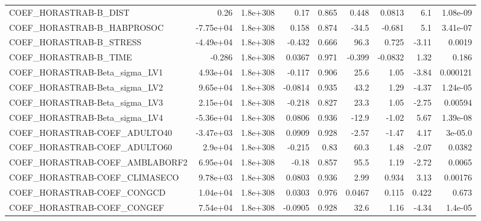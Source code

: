 \begin{tabular}{lrrrrrrrr}
COEF\_HORASTRAB-B\_DIST             &        0.26 &     1.8e+308 &    0.17 &    0.865 &      0.448 &      0.0813 &          6.1 &      1.08e-09 \\
COEF\_HORASTRAB-B\_HABPROSOC        &   -7.75e+04 &     1.8e+308 &   0.158 &    0.874 &      -34.5 &      -0.681 &          5.1 &      3.41e-07 \\
COEF\_HORASTRAB-B\_STRESS           &   -4.49e+04 &     1.8e+308 &  -0.432 &    0.666 &       96.3 &       0.725 &        -3.11 &        0.0019 \\
COEF\_HORASTRAB-B\_TIME             &      -0.286 &     1.8e+308 &  0.0367 &    0.971 &     -0.399 &     -0.0832 &         1.32 &         0.186 \\
COEF\_HORASTRAB-Beta\_sigma\_LV1     &    4.93e+04 &     1.8e+308 &  -0.117 &    0.906 &       25.6 &        1.05 &        -3.84 &      0.000121 \\
COEF\_HORASTRAB-Beta\_sigma\_LV2     &    9.65e+04 &     1.8e+308 & -0.0814 &    0.935 &       43.2 &        1.29 &        -4.37 &      1.24e-05 \\
COEF\_HORASTRAB-Beta\_sigma\_LV3     &    2.15e+04 &     1.8e+308 &  -0.218 &    0.827 &       23.3 &        1.05 &        -2.75 &       0.00594 \\
COEF\_HORASTRAB-Beta\_sigma\_LV4     &   -5.36e+04 &     1.8e+308 &  0.0806 &    0.936 &      -12.9 &       -1.02 &         5.67 &      1.39e-08 \\
COEF\_HORASTRAB-COEF\_ADULTO40      &   -3.47e+03 &     1.8e+308 &  0.0909 &    0.928 &      -2.57 &       -1.47 &         4.17 &       3e-05.0 \\
COEF\_HORASTRAB-COEF\_ADULTO60      &     2.9e+04 &     1.8e+308 &  -0.215 &     0.83 &       60.3 &        1.48 &        -2.07 &        0.0382 \\
COEF\_HORASTRAB-COEF\_AMBLABORF2    &    6.95e+04 &     1.8e+308 &   -0.18 &    0.857 &       95.5 &        1.19 &        -2.72 &        0.0065 \\
COEF\_HORASTRAB-COEF\_CLIMASECO     &    9.78e+03 &     1.8e+308 &  0.0803 &    0.936 &       2.99 &       0.934 &         3.13 &       0.00176 \\
COEF\_HORASTRAB-COEF\_CONGCD        &    1.04e+04 &     1.8e+308 &  0.0303 &    0.976 &     0.0467 &       0.115 &        0.422 &         0.673 \\
COEF\_HORASTRAB-COEF\_CONGEF        &    7.54e+04 &     1.8e+308 & -0.0905 &    0.928 &       32.6 &        1.16 &        -4.34 &       1.4e-05 \\

\end{tabular}
